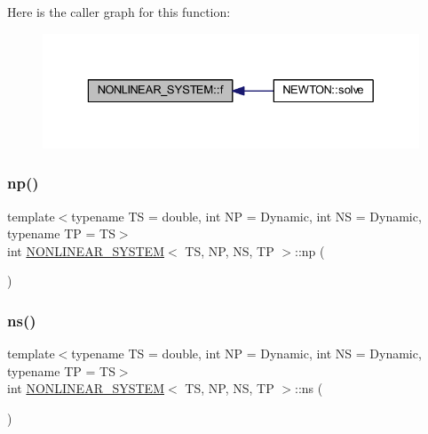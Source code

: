 Here is the caller graph for this function\+:
\nopagebreak
\begin{figure}[H]
\begin{center}
\leavevmode
\includegraphics[width=329pt]{class_n_o_n_l_i_n_e_a_r___s_y_s_t_e_m_a65827d7df297f26cd3f14f472a212077_icgraph}
\end{center}
\end{figure}
\mbox{\label{class_n_o_n_l_i_n_e_a_r___s_y_s_t_e_m_ab5876470030832088d8ee1ed609d5311}} 
\subsubsection{\texorpdfstring{np()}{np()}}
{\footnotesize\ttfamily template$<$typename TS = double, int NP = Dynamic, int NS = Dynamic, typename TP = TS$>$ \\
int \mbox{\hyperlink{class_n_o_n_l_i_n_e_a_r___s_y_s_t_e_m}{N\+O\+N\+L\+I\+N\+E\+A\+R\+\_\+\+S\+Y\+S\+T\+EM}}$<$ TS, NP, NS, TP $>$\+::np (\begin{DoxyParamCaption}{ }\end{DoxyParamCaption})\hspace{0.3cm}{\ttfamily [inline]}}

\mbox{\label{class_n_o_n_l_i_n_e_a_r___s_y_s_t_e_m_abf4102c649f8316e44033a76f9d6183f}} 
\subsubsection{\texorpdfstring{ns()}{ns()}}
{\footnotesize\ttfamily template$<$typename TS = double, int NP = Dynamic, int NS = Dynamic, typename TP = TS$>$ \\
int \mbox{\hyperlink{class_n_o_n_l_i_n_e_a_r___s_y_s_t_e_m}{N\+O\+N\+L\+I\+N\+E\+A\+R\+\_\+\+S\+Y\+S\+T\+EM}}$<$ TS, NP, NS, TP $>$\+::ns (\begin{DoxyParamCaption}{ }\end{DoxyParamCaption})\hspace{0.3cm}{\ttfamily [inline]}}

